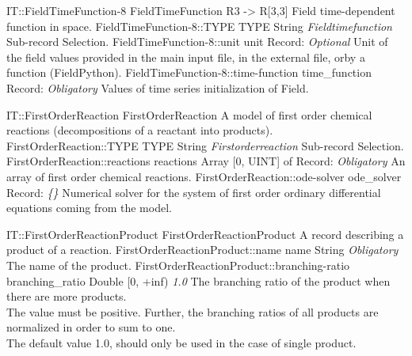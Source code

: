 \begin{RecordType}
	{IT::FieldTimeFunction-8}
	{FieldTimeFunction}
	{} %
	{} %
	{{{R3 -{\textgreater} R[3,3] Field time-dependent function in space.}}}
		\RecKey
			{FieldTimeFunction-8::TYPE}
			{TYPE}
			{{String}}
			{ \it{Fieldtimefunction} }
			{{{Sub-record Selection.}}}
		\RecKey
			{FieldTimeFunction-8::unit}
			{unit}
			{{Record}{: }}
			{ \it{Optional} }
			{{{Unit of the field values provided in the main input file, in the external file, orby a function (FieldPython).}}}
		\RecKey
			{FieldTimeFunction-8::time-function}
			{time{\_}function}
			{{Record}{: }}
			{ \it{Obligatory} }
			{{{Values of time series initialization of Field.}}}
\end{RecordType}
\begin{RecordType}
	{IT::FirstOrderReaction}
	{FirstOrderReaction}
	{} %
	{} %
	{{{A model of first order chemical reactions (decompositions of a reactant into products).}}}
		\RecKey
			{FirstOrderReaction::TYPE}
			{TYPE}
			{{String}}
			{ \it{Firstorderreaction} }
			{{{Sub-record Selection.}}}
		\RecKey
			{FirstOrderReaction::reactions}
			{reactions}
			{{Array [0, UINT] of }{Record}{: }}
			{ \it{Obligatory} }
			{{{An array of first order chemical reactions.}}}
		\RecKey
			{FirstOrderReaction::ode-solver}
			{ode{\_}solver}
			{{Record}{: }}
			{ \it{{\{}{\}}} }
			{{{Numerical solver for the system of first order ordinary differential equations coming from the model.}}}
\end{RecordType}
\begin{RecordType}
	{IT::FirstOrderReactionProduct}
	{FirstOrderReactionProduct}
	{} %
	{} %
	{{{A record describing a product of a reaction.}}}
		\RecKey
			{FirstOrderReactionProduct::name}
			{name}
			{{String}}
			{ \it{Obligatory} }
			{{{The name of the product.}}}
		\RecKey
			{FirstOrderReactionProduct::branching-ratio}
			{branching{\_}ratio}
			{{Double [0, +inf)}}
			{ \it{1.0} }
			{{{The branching ratio of the product when there are more products.}\\{
The value must be positive. Further, the branching ratios of all products are normalized in order to sum to one.}\\{
The default value 1.0, should only be used in the case of single product.}}}
\end{RecordType}
